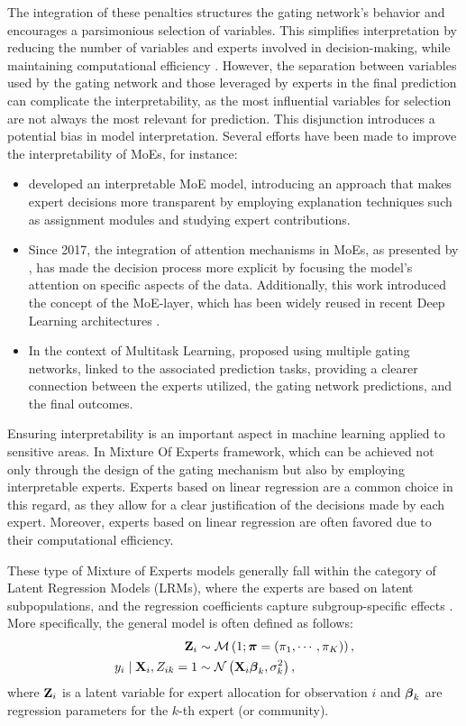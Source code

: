 The integration of these penalties structures the gating network's behavior and encourages a parsimonious selection of variables. This simplifies interpretation by reducing the number of variables and experts involved in decision-making, while maintaining computational efficiency \citep{shazeer2017outrageously}. However, the separation between variables used by the gating network and those leveraged by experts in the final prediction can complicate the interpretability, as the most influential variables for selection are not always the most relevant for prediction. This disjunction introduces a potential bias in model interpretation.
Several efforts have been made to improve the interpretability of MoEs, for instance:
\begin{itemize}
    \item \cite{ismail2022interpretable} developed an interpretable MoE model, introducing an approach that makes expert decisions more transparent by employing explanation techniques such as assignment modules and studying expert contributions.
    \item Since 2017, the integration of attention mechanisms in MoEs, as presented by \cite{shazeer2017outrageously}, has made the decision process more explicit by focusing the model's attention on specific aspects of the data. Additionally, this work introduced the concept of the MoE-layer, which has been widely reused in recent Deep Learning architectures \citep{lepikhin2020gshard, fedus2022switch, zhou2022mixture}.
    \item In the context of Multitask Learning, \cite{ma2018modeling} proposed using multiple gating networks, linked to the associated prediction tasks, providing a clearer connection between the experts utilized, the gating network predictions, and the final outcomes.
\end{itemize}

Ensuring interpretability is an important aspect in machine learning applied to sensitive areas. In Mixture Of Experts framework, which can be achieved not only through the design of the gating mechanism but also by employing interpretable experts. Experts based on linear regression are a common choice in this regard, as they allow for a clear justification of the decisions made by each expert. Moreover, experts based on linear regression are often favored due to their computational efficiency.

These type of Mixture of Experts models generally fall within the category of Latent Regression Models (LRMs), where the experts are based on latent subpopulations, and the regression coefficients capture subgroup-specific effects \citep{vermunt2002latent, desarbo1988maximum}.
More specifically, the general model is often defined as follows:
\begin{align}
    \mathbf{Z}_i &\sim \operatorname{\mathcal{M}}\left(1; \boldsymbol{\pi} = \left(\pi_1, \cdots, \pi_K\right) \right), \\
    y_i \mid \mathbf{X}_i, Z_{ik}=1 &\sim \mathcal{N}\left(\mathbf{X}_i \boldsymbol{\beta}_k, \sigma^2_k\right),
\end{align}
where $\mathbf{Z}_i$ is a latent variable for expert allocation for observation $i$ and $\boldsymbol{\beta}_k$ are regression parameters for the $k$-th expert (or community).

